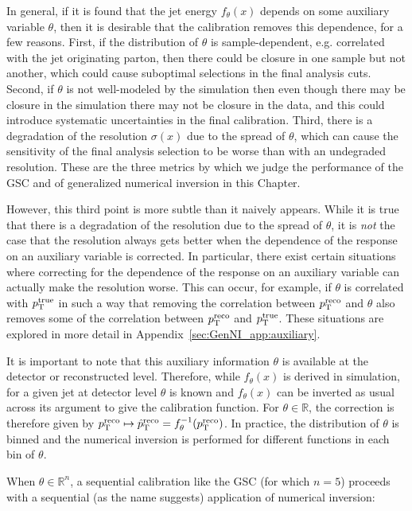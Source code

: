 In general, if it is found that the jet energy $f_\theta(x)$ depends on some auxiliary variable $\theta$, then it is desirable that the calibration removes this dependence, for a few reasons.
First, if the distribution of $\theta$ is sample-dependent, e.g. correlated with the jet originating parton, then there could be closure in one sample but not another, which could cause suboptimal selections in the final analysis cuts.
Second, if $\theta$ is not well-modeled by the simulation then even though there may be closure in the simulation there may not be closure in the data, and this could introduce systematic uncertainties in the final calibration.
Third, there is a degradation of the resolution $\sigma(x)$ due to the spread of $\theta$, which can cause the sensitivity of the final analysis selection to be worse than with an undegraded resolution.
These are the three metrics by which we judge the performance of the GSC and of generalized numerical inversion in this Chapter.

However, this third point is more subtle than it naively appears.
While it is true that there is a degradation of the resolution due to the spread of $\theta$, it is \emph{not} the case that the resolution always gets better when the dependence of the response on an auxiliary variable is corrected.
In particular, there exist certain situations where correcting for the dependence of the response on an auxiliary variable can actually make the resolution worse.
This can occur, for example, if $\theta$ is correlated with $p_\text{T}^\text{true}$ in such a way that removing the correlation between $p_\text{T}^\text{reco}$ and $\theta$ also removes some of the correlation between $p_\text{T}^\text{reco}$ and $p_\text{T}^\text{true}$.
These situations are explored in more detail in Appendix~\ref{sec:GenNI_app:auxiliary}.

It is important to note that this auxiliary information $\theta$ is available at the detector or reconstructed level.
Therefore, while $f_\theta(x)$ is derived in simulation, for a given jet at detector level $\theta$ is known and $f_\theta(x)$ can be inverted as usual across its argument to give the calibration function.
For $\theta\in\mathbb{R}$, the correction is therefore given by $p_\text{T}^\text{reco}\mapsto \hat{p}_\text{T}^\text{reco} = f_\theta^{-1}(p_\text{T}^\text{reco})$.
In practice, the distribution of $\theta$ is binned and the numerical inversion is performed for different functions in each bin of $\theta$.


When $\theta\in\mathbb{R}^n$, a sequential calibration like the GSC (for which $n=5$) proceeds with a sequential (as the name suggests) application of numerical inversion:

